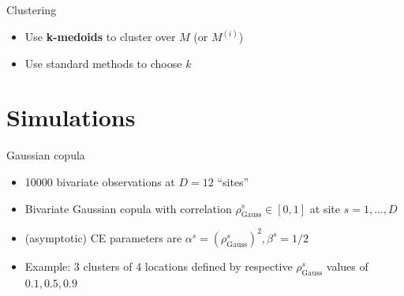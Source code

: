 \documentclass[14pt,aspectratio=169]{beamer}
\newcommand{\eJSGa}[1]{\mathop{\mathrm{eJS}_{i, #1}^{\mathrm{G}_{\lambda}}}\nolimits}
\begin{document}
% 
% 
% 
% 

\begin{frame}{Clustering}
  \begin{itemize}
    \item Use \textbf{k-medoids} to cluster over $M$ (or $M^{(i)}$) 
    \item Use standard methods to choose $k$
  \end{itemize}
\end{frame}

\section{Simulations}

\begin{frame}{Gaussian copula}
  \begin{itemize}
    \item <1-> \num[group-separator={,}]{10000} bivariate observations at $D = 12$ ``sites''
    \item <1-> Bivariate Gaussian copula with correlation $\rho^{s}_{\text{Gauss}} \in [0, 1]$ at site $s = 1, \ldots, D$
    \item <2-> (asymptotic) CE parameters are $\alpha^{s} = (\rho^{s}_{\text{Gauss}})^2, \beta^{s} = 1/2$
    \item <3-> Example: 3 clusters of 4 locations defined by respective $\rho^{s}_{\text{Gauss}}$ values of $0.1, 0.5, 0.9$
  \end{itemize}

\end{frame}
\end{document}
